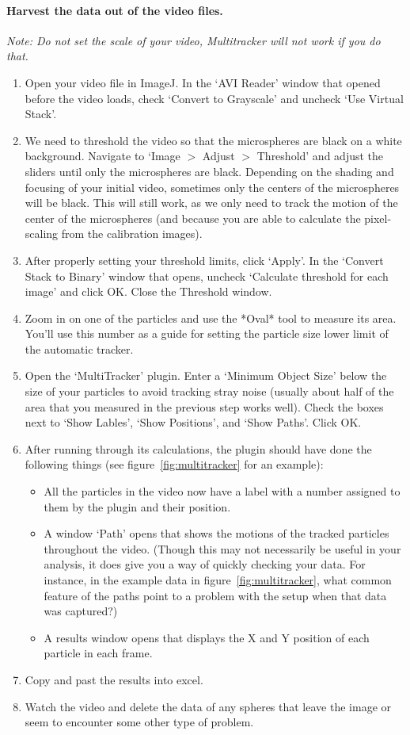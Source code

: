 \paragraph*{Harvest the data out of the video files.}
\emph{Note: Do not set the scale of your video, Multitracker will not work if you do that.}
\begin{enumerate}
\item Open your video file in ImageJ. In the `AVI Reader' window that opened before the video loads, check `Convert to Grayscale' and uncheck `Use Virtual Stack'.
\item We need to threshold the video so that the microspheres are black on a white background. Navigate to `Image $>$ Adjust $>$ Threshold' and adjust the sliders until only the microspheres are black. Depending on the shading and focusing of your initial video, sometimes only the centers of the microspheres will be black. This will still work, as we only need to track the motion of the center of the microspheres (and because you are able to calculate the pixel-scaling from the calibration images).
\item After properly setting your threshold limits, click `Apply'. In the `Convert Stack to Binary' window that opens, uncheck `Calculate threshold for each image' and click OK. Close the Threshold window.
\item Zoom in on one of the particles and use the *Oval* tool to measure its area. You'll use this number as a guide for setting the particle size lower limit of the automatic tracker.
\item Open the `MultiTracker' plugin. Enter a `Minimum Object Size' below the size of your particles to avoid tracking stray noise (usually about half of the area that you measured in the previous step works well). Check the boxes next to `Show Lables', `Show Positions', and `Show Paths'. Click OK.
\item After running through its calculations, the plugin should have done the following things (see figure~\ref{fig:multitracker} for an example):
\begin{itemize}
	\item All the particles in the video now have a label with a number assigned to them by the plugin and their position.
	\item A window `Path' opens that shows the motions of the tracked particles throughout the video. (Though this may not necessarily be useful in your analysis, it does give you a way of quickly checking your data. For instance, in the example data in figure~\ref{fig:multitracker}, what common feature of the paths point to a problem with the setup when that data was captured?)
	\item A results window opens that displays the X and Y position of each particle in each frame.
\end{itemize}
\item Copy and past the results into excel.
\item Watch the video and delete the data of any spheres that leave the image or seem to encounter some other type of problem.
\end{enumerate}
